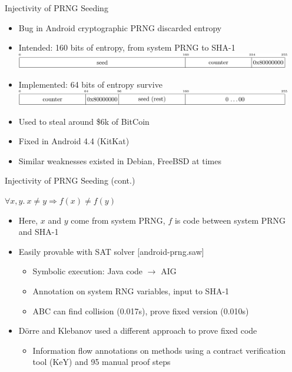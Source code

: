 \documentclass[ignorenonframetext,]{beamer}
\providecommand{\tightlist}{%
  \setlength{\itemsep}{0pt}\setlength{\parskip}{0pt}}
\newcommand{\infile}[1]{{\tiny \alert{[#1]}}}
\begin{document}
\begin{frame}{Injectivity of PRNG Seeding}

\begin{itemize}
\tightlist
\item
  Bug in Android cryptographic PRNG discarded entropy
\item
  Intended: 160 bits of entropy, from system PRNG to SHA-1
  \includegraphics[width=0.95\textwidth]{images/prng-intended.pdf}
\item
  Implemented: 64 bits of entropy survive
  \includegraphics[width=0.95\textwidth]{images/prng-buggy.pdf}
\item
  Used to steal around \$6k of BitCoin
\item
  Fixed in Android 4.4 (KitKat)
\item
  Similar weaknesses existed in Debian, FreeBSD at times
\end{itemize}

\end{frame}

\begin{frame}{Injectivity of PRNG Seeding (cont.)}

\begin{center}
$\forall x, y.~x \neq y \Rightarrow f(x) \neq f(y)$
\end{center}

\begin{itemize}
\tightlist
\item
  Here, \(x\) and \(y\) come from system PRNG, \(f\) is code between
  system PRNG and SHA-1
\item
  Easily provable with SAT solver \infile{android-prng.saw}

  \begin{itemize}
  \tightlist
  \item
    Symbolic execution: Java code \(\rightarrow\) AIG
  \item
    Annotation on system RNG variables, input to SHA-1
  \item
    ABC can find collision (0.017s), prove fixed version (0.010s)
  \end{itemize}
\item
  Dörre and Klebanov used a different approach to prove fixed code
  \cite{dorre2015prng}

  \begin{itemize}
  \tightlist
  \item
    Information flow annotations on methods using a contract
    verification tool (KeY) and 95 manual proof steps
  \end{itemize}
\end{itemize}

\end{frame}
\end{document}
